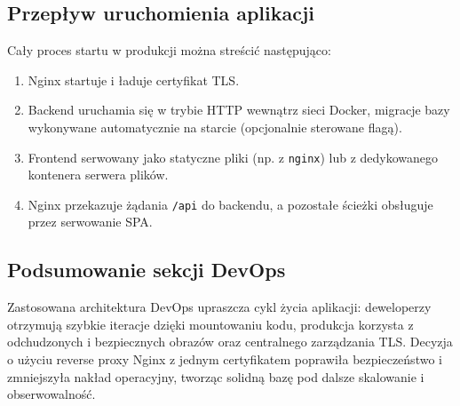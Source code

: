 \subsection{Przepływ uruchomienia aplikacji}

\noindent
Cały proces startu w produkcji można streścić następująco:
\begin{enumerate}
    \item Nginx startuje i ładuje certyfikat TLS.
    \item Backend uruchamia się w trybie HTTP wewnątrz sieci Docker, migracje bazy wykonywane automatycznie na starcie (opcjonalnie sterowane flagą).
    \item Frontend serwowany jako statyczne pliki (np. z \texttt{nginx}) lub z dedykowanego kontenera serwera plików.
    \item Nginx przekazuje żądania \texttt{/api} do backendu, a pozostałe ścieżki obsługuje przez serwowanie SPA.
\end{enumerate}

\subsection{Podsumowanie sekcji DevOps}

Zastosowana architektura DevOps upraszcza cykl życia aplikacji: deweloperzy otrzymują szybkie iteracje dzięki mountowaniu kodu, produkcja korzysta z odchudzonych i bezpiecznych obrazów oraz centralnego zarządzania TLS. Decyzja o użyciu reverse proxy Nginx z jednym certyfikatem poprawiła bezpieczeństwo i zmniejszyła nakład operacyjny, tworząc solidną bazę pod dalsze skalowanie i obserwowalność.
